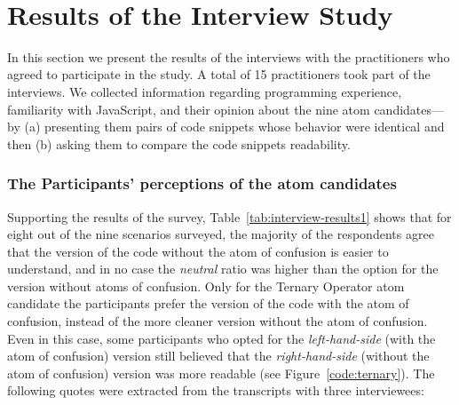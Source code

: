 \


\section{Results of the Interview Study}
\label{sec:interview-results}


In this section we present the results of the 
interviews with the practitioners who agreed to participate
in the study. A total of 15 practitioners
took part of the interviews.
We collected information regarding programming
experience, familiarity with JavaScript, and their opinion
about the nine atom candidates---by
(a) presenting them pairs of code snippets whose behavior were identical
and then (b) asking them to compare the code snippets readability.


\subsubsection*{The Participants' perceptions of the atom candidates}
Supporting the results of the survey, Table~\ref{tab:interview-results1}
 shows that for eight out of the
nine scenarios surveyed, the majority of the respondents agree that the version of the
code without the atom of confusion is easier to understand, and in no case the \emph{neutral}
ratio was higher than the option for the version without atoms of confusion.
Only for the Ternary Operator atom candidate the participants
prefer the version of the code with the atom of confusion,
instead of the more cleaner version without the atom of confusion.
Even in this case, some participants who opted for
the \emph{left-hand-side} (with the atom of confusion) version
still believed that the \emph{right-hand-side} (without the atom of
confusion) version was more readable (see Figure~\ref{code:ternary}). 
The following quotes were extracted from the transcripts with
three interviewees:

